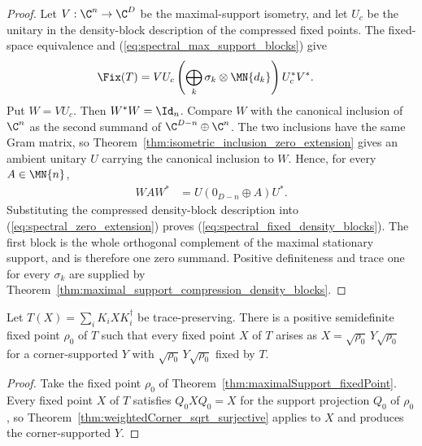\begin{proof}
    \leanok
    Let $V:\C^n\to\C^D$ be the maximal-support isometry, and let $U_c$ be
    the unitary in the density-block description of the compressed fixed
    points. The fixed-space equivalence and
    (\ref{eq:spectral_max_support_blocks}) give
    \begin{align}
        \Fix(T)
         & =VU_c\left(\bigoplus_k
        \sigma_k\otimes\MN{d_k}\right)U_c^*V^*.
        \notag
    \end{align}
    Put $W=VU_c$. Then $W^*W=\Id_n$. Compare $W$ with the canonical
    inclusion of $\C^n$ as the second summand of
    $\C^{D-n}\oplus\C^n$. The two inclusions have the same Gram matrix, so
    Theorem~\ref{thm:isometric_inclusion_zero_extension} gives an ambient
    unitary $U$ carrying the canonical inclusion to $W$. Hence, for every
    $A\in\MN{n}$,
    \begin{align}
        WAW^*
         & =U(0_{D-n}\oplus A)U^*.
        \label{eq:spectral_zero_extension}
    \end{align}
    Substituting the compressed density-block description into
    (\ref{eq:spectral_zero_extension}) proves
    (\ref{eq:spectral_fixed_density_blocks}). The first block is the whole
    orthogonal complement of the maximal stationary support, and is
    therefore one zero summand. Positive definiteness and trace one for
    every $\sigma_k$ are supplied by
    Theorem~\ref{thm:maximal_support_compression_density_blocks}.
\end{proof}

\begin{theorem}%
    \label{thm:maximalSupport_weightedCorner}
    \leanok
    Let $T(X)=\sum_iK_iXK_i^\dagger$ be trace-preserving. There is a
    positive semidefinite fixed point $\rho_0$ of $T$ such that every fixed
    point $X$ of $T$ arises as
    $X=\sqrt{\rho_0}\,Y\sqrt{\rho_0}$ for a corner-supported $Y$ with
    $\sqrt{\rho_0}\,Y\sqrt{\rho_0}$ fixed by $T$.
\end{theorem}

\begin{proof}
    \leanok
    Take the fixed point $\rho_0$ of
    Theorem~\ref{thm:maximalSupport_fixedPoint}. Every fixed point $X$ of
    $T$ satisfies $Q_0XQ_0=X$ for the support projection $Q_0$ of
    $\rho_0$, so Theorem~\ref{thm:weightedCorner_sqrt_surjective} applies
    to $X$ and produces the corner-supported $Y$.
\end{proof}

